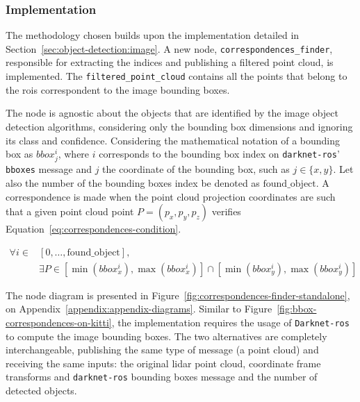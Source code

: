 \subsubsection{Implementation}
The methodology chosen builds upon the implementation detailed in Section~\ref{sec:object-detection:image}. A new node, \texttt{correspondences\_finder}, responsible for extracting the indices and  publishing a filtered point cloud, is implemented. The \texttt{filtered\_point\_cloud} contains all the points that belong to the \acp{roi} correspondent to the image bounding boxes. 

The node is agnostic about the objects that are identified by the image object detection algorithms, considering only the bounding box dimensions and ignoring its class and confidence. Considering the mathematical notation of a bounding box as $bbox^i_j$, where $i$ corresponds to the bounding box index on \texttt{darknet-ros}' \texttt{bboxes} message and $j$ the coordinate of the bounding box, such as $j \in \{x, y\}$. Let also the number of the bounding boxes index be denoted as $\text{found\_object}$. A correspondence is made when the point cloud projection coordinates are such that a given point cloud point $P = (p_x, p_y,p_z)$ verifies Equation~\eqref{eq:correspondences-condition}.

\begin{align}
	\label{eq:correspondences-condition}
	\forall i \in & [0, \ldots, \text{found\_object}], \nonumber \\ 
			& \exists P \in [\min(bbox^i_x), \max(bbox^i_x)] \cap [\min(bbox^i_y), \max(bbox^i_y)] 
\end{align}

The node diagram is presented in Figure~\ref{fig:correspondences-finder-standalone}, on Appendix~\ref{appendix:appendix-diagrams}. Similar to Figure~\ref{fig:bbox-correspondences-on-kitti}, the implementation requires the usage of \texttt{Darknet-ros} to compute the image bounding boxes. The two alternatives are completely interchangeable, publishing the same type of message (a point cloud) and receiving the same inputs: the original \ac{lidar} point cloud, coordinate frame transforms and \texttt{darknet-ros} bounding boxes message and the number of detected objects.

%		

